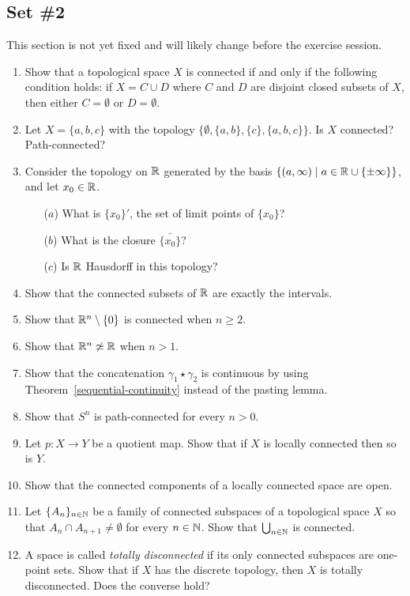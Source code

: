 \subsection{Set \#2}
This section is not yet fixed and will likely change before the exercise session.
\begin{enumerate}
  \item Show that a topological space $X$ is connected if and only if the following condition holds: if $X = C \cup D$ where $C$ and $D$ are disjoint closed subsets of $X$, then either $C = \emptyset$ or $D = \emptyset$.
  \item Let $X = \{a,b,c\}$ with the topology $\{\emptyset,\{a,b\},\{c\},\{a,b,c\}\}$. Is $X$ connected? Path-connected?
  \item Consider the topology on $\mathbb{R}$ generated by the basis $\{(a,\infty) \mid a \in \mathbb{R} \cup \{\pm \infty\}\}$, and let $x_0 \in \mathbb{R}$. \begin{itemize}
    \item[($a$)] What is $\{x_0\}'$, the set of limit points of $\{x_0\}$?
    \item[($b$)] What is the closure $\bar{\{x_0\}}$?
    \item[($c$)] Is $\mathbb{R}$ Hausdorff in this topology?
  \end{itemize}
  \item \label{connected-implies-interval} Show that the connected subsets of $\mathbb{R}$ are exactly the intervals.
  \item \label{origin-removed-connected} Show that $\mathbb{R}^n \setminus \{0\}$ is connected when $n \geq 2$.
  \item Show that $\mathbb{R}^n \not\simeq \mathbb{R}$ when $n > 1$.
  \item Show that the concatenation $\gamma_1 \star \gamma_2$ is continuous by using Theorem~\ref{sequential-continuity} instead of the pasting lemma.
  \item Show that $S^n$ is path-connected for every $n > 0$.
  \item Let $p : X \to Y$ be a quotient map. Show that if $X$ is locally connected then so is $Y$.
  \item \label{locally-connected-open} Show that the connected components of a locally connected space are open.
  \item Let $\{A_n\}_{n \in \mathbb{N}}$ be a family of connected subspaces of a topological space $X$ so that $A_n \cap A_{n+1} \not= \emptyset$ for every $n \in \mathbb{N}$. Show that $\bigcup_{n \in \mathbb{N}}$ is connected.
  \item A space is called \emph{totally disconnected} if its only connected subspaces are one-point sets. Show that if $X$ has the discrete topology, then $X$ is totally disconnected. Does the converse hold?

\end{enumerate}
